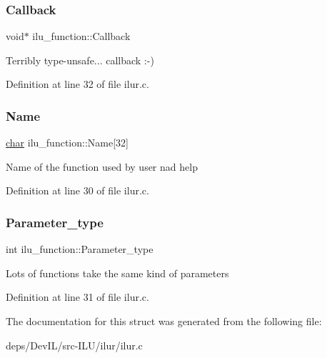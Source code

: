 \subsubsection{\texorpdfstring{Callback}{Callback}}
{\footnotesize\ttfamily void$\ast$ ilu\+\_\+function\+::\+Callback}

Terribly type-\/unsafe... callback \+:-\/) 

Definition at line 32 of file ilur.\+c.

\mbox{\label{structilu__function_a6664d6d8776c752cd5edadb1bcc95a8a}} 
\subsubsection{\texorpdfstring{Name}{Name}}
{\footnotesize\ttfamily \hyperlink{classchar}{char} ilu\+\_\+function\+::\+Name\mbox{[}32\mbox{]}}

Name of the function used by user nad help 

Definition at line 30 of file ilur.\+c.

\mbox{\label{structilu__function_a5f642a9d8c4238dcad1b37abacc6142b}} 
\subsubsection{\texorpdfstring{Parameter\+\_\+type}{Parameter\_type}}
{\footnotesize\ttfamily int ilu\+\_\+function\+::\+Parameter\+\_\+type}

Lots of functions take the same kind of parameters 

Definition at line 31 of file ilur.\+c.



The documentation for this struct was generated from the following file\+:\begin{DoxyCompactItemize}
\item 
deps/\+Dev\+I\+L/src-\/\+I\+L\+U/ilur/ilur.\+c\end{DoxyCompactItemize}
